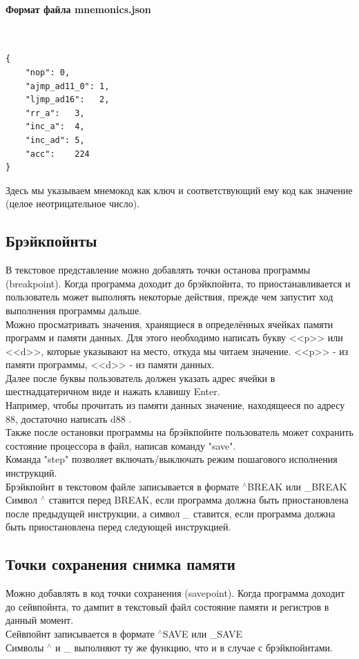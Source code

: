 \paragraph{Формат файла mnemonics.json}~\\
\begin{lstlisting}
{
	"nop": 0,	
	"ajmp_ad11_0": 1,
	"ljmp_ad16":   2,
	"rr_a":   3,
	"inc_a":  4,
	"inc_ad": 5,
	"acc":    224
}
\end{lstlisting}
Здесь мы указываем мнемокод как ключ и соответствующий ему код как значение (целое неотрицательное число). 

\newpage
\subsection{Брэйкпойнты}
В текстовое представление можно добавлять точки останова программы (breakpoint). Когда программа доходит до брэйкпойнта, то приостанавливается и пользователь может выполнять некоторые действия, прежде чем запустит ход выполнения программы дальше.\\
Можно просматривать значения, хранящиеся в определённых ячейках памяти программ и памяти данных. Для этого необходимо написать букву <<p>> или <<d>>, которые указывают на место, откуда мы читаем значение. <<p>> - из памяти программы, <<d>> - из памяти данных. \\
Далее после буквы пользователь должен указать адрес ячейки в шестнадцатеричном виде и нажать клавишу Enter. \\
Например, чтобы прочитать из памяти данных значение, находящееся по адресу 88, достаточно написать d88 . \\
Также после остановки программы на брэйкпойнте пользователь может сохранить состояние процессора в файл, написав команду "save". \\
Команда "step" позволяет включать/выключать режим пошагового исполнения инструкций. \\
Брэйкпойнт в текстовом файле записывается в формате $^\wedge$BREAK или \_BREAK \\
Символ $^\wedge$ ставится перед BREAK, если программа должна быть приостановлена после предыдущей инструкции, а символ \_ ставится, если программа должна быть приостановлена перед следующей инструкцией.

\subsection{Точки сохранения снимка памяти}
Можно добавлять в код точки сохранения (savepoint). Когда программа доходит до сейвпойнта, то дампит в текстовый файл состояние памяти и регистров в данный момент.\\
Сейвпойнт записывается в формате $^\wedge$SAVE или \_SAVE \\
Символы $^\wedge$ и \_ выполняют ту же функцию, что и в случае с брэйкпойнтами. \\

